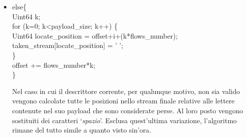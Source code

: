 \begin{itemize}
\begin{notabene}
Non ha senso effettuare paragoni tra descrittori appartenenti a flussi diversi, in quanto non sono in alcun modo correlati.
\end{notabene}
Se il descrittore corrente viene ritenuto valido all'interno del Multiple
Description Stream si passa alla decodifica. Viene prelevato il payload e
trasferito in una struttura dati in memoria (Memory DataChunk). Il contenitore temporaneo dello stream decodificato viene ridimensionato per contenere (potenzialmente) tutti i payload provenienti da tutti i descrittori. \`E possibile raggiungere la dimensione massima esclusivamente nel caso in cui non vi sia alcun errore di trasmissione. Successivamente si prelevano le singole lettere dalla struttura dati in memoria. Se la i-esima lettera estratta ha un codice ascii diverso da `\emph{0}' si passa al calcolo della sua posizione assoluta all'interno dello stream finale (decodificato) e al posizionamento del carattere corrente in tale posizione. Infine viene aggiornato un contatore che tiene conto della massima posizione raggiunta in tale fase. Tale contatore servirà successivamente, pertanto il suo significato verrà descritto in seguito.

 \item \begin{code}
else\{\\
	Uint64 k;\\
	for (k=0; k<payload\_size; k++) \{\\
		Uint64 locate\_position = offset+i+(k*flows\_number);\\
		taken\_stream[locate\_position] = ' ';\\
	\}\\
	offset += flows\_number*k;\\
\}\\
\end{code}
Nel caso in cui il descrittore corrente, per qualunque motivo, non sia valido vengono calcolate tutte le posizioni nello stream finale relative alle lettere contenute nel suo payload che sono considerate perse. Al loro posto vengono sostituiti dei caratteri `\emph{spazio}'. Esclusa quest'ultima variazione, l'algoritmo rimane del tutto simile a quanto visto sin'ora.


\end{itemize}
